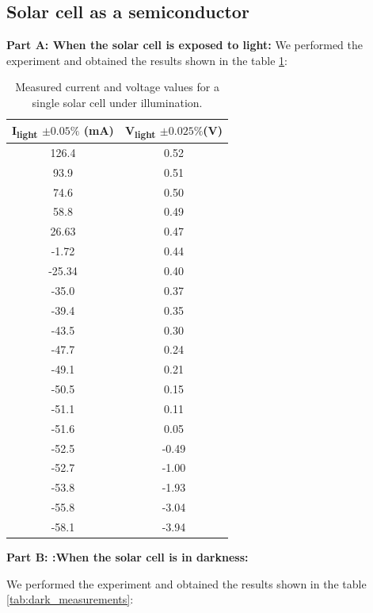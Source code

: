 \documentclass[12pt]{article}
\begin{document}
\subsection{Solar cell as a semiconductor}
\textbf{Part A: When the solar cell is exposed to light:}
We performed the experiment and obtained the results shown in the table \ref{tab:light_measurements}:
\begin{table}[H]
\centering
\begin{tabular}{|c|c|}
\hline
\textbf{I\textsubscript{light} \( \pm0.05\% \) (mA)} & \textbf{V\textsubscript{light} \( \pm0.025\% \)(V)} \\
\hline
126.4  & 0.52  \\
93.9   & 0.51  \\
74.6   & 0.50  \\
58.8   & 0.49  \\
26.63  & 0.47  \\
-1.72  & 0.44  \\
-25.34 & 0.40  \\
-35.0  & 0.37  \\
-39.4  & 0.35  \\
-43.5  & 0.30  \\
-47.7  & 0.24  \\
-49.1  & 0.21  \\
-50.5  & 0.15  \\
-51.1  & 0.11  \\
-51.6  & 0.05  \\
-52.5  & -0.49 \\
-52.7  & -1.00 \\
-53.8  & -1.93 \\
-55.8  & -3.04 \\
-58.1  & -3.94 \\
\hline
\end{tabular}
\caption{Measured current and voltage values for a single solar cell under illumination.}
\label{tab:light_measurements}
\end{table}

\textbf{Part B: :When the solar cell is in darkness:}

We performed the experiment and obtained the results shown in the table \ref{tab:dark_measurements}:
\end{document}
